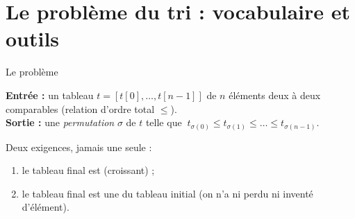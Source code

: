 \documentclass[11pt,aspectratio=169]{beamer}
\begin{document}
\section{Le problème du tri : vocabulaire et outils}

\begin{frame}{Le problème}
\begin{encadre}[title=Problème du tri,fonttitle=\bfseries]
\textbf{Entrée :} un tableau $t=[t[0],\dots,t[n-1]]$ de $n$ éléments deux à deux
comparables (relation d'ordre total $\le$).\\[3pt]
\textbf{Sortie :} une \emph{permutation} $\sigma$ de $t$ telle que
$\ t_{\sigma(0)}\le t_{\sigma(1)}\le\dots\le t_{\sigma(n-1)}$.
\end{encadre}
\vspace{6pt}
Deux exigences, jamais une seule :
\begin{enumerate}[<+->]
  \item le tableau final est  (croissant) ;
  \item le tableau final est une  du tableau initial
        (on n'a ni perdu ni inventé d'élément).
\end{enumerate}
\vspace{4pt}
\end{frame}
\end{document}
